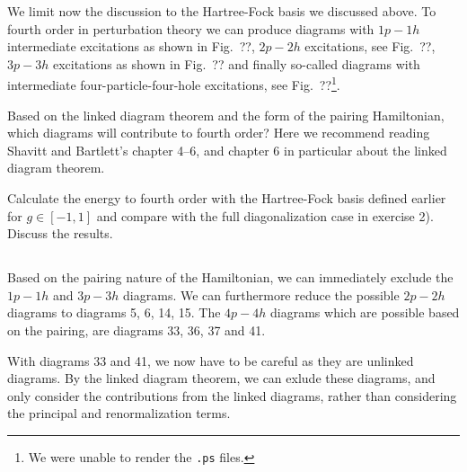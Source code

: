 We limit now the discussion to the Hartree-Fock basis  we discussed above.
To fourth order in perturbation theory we can produce diagrams with $1p-1h$ intermediate excitations as shown in Fig.~??, $2p-2h$ excitations, see Fig.~??, $3p-3h$ excitations as shown in Fig.~?? and finally so-called diagrams with intermediate four-particle-four-hole excitations, see Fig.~??\footnote{We were unable to render the \texttt{.ps} files.}.

Based on the linked diagram theorem and the form of the pairing Hamiltonian, which diagrams will contribute to fourth order?
Here we recommend reading Shavitt and Bartlett's chapter 4--6, and chapter 6 in particular about the linked diagram theorem.

Calculate the energy to fourth order with the Hartree-Fock basis defined earlier for $g \in [-1,1]$ and compare with the full diagonalization case in exercise 2). %
Discuss the results.

\subsection{}
Based on the pairing nature of the Hamiltonian, we can immediately exclude the $1p-1h$ and $3p-3h$ diagrams.
We can furthermore reduce the possible $2p-2h$ diagrams to diagrams 5, 6, 14, 15.
The $4p-4h$ diagrams which are possible based on the pairing, are diagrams 33, 36, 37 and 41.

With diagrams 33 and 41, we now have to be careful as they are unlinked diagrams.
By the linked diagram theorem, we can exlude these diagrams, and only consider the contributions from the linked diagrams, rather than considering the principal and renormalization terms.

